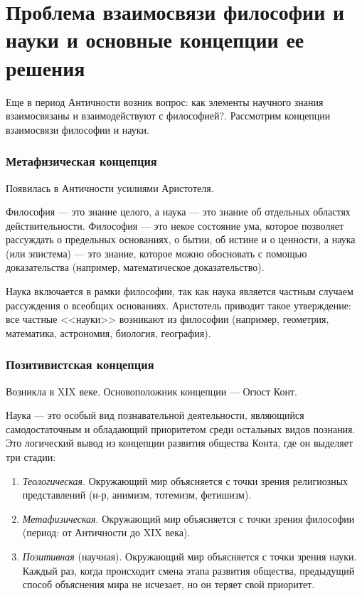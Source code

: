 	\section {Проблема взаимосвязи философии и науки и основные концепции ее решения}

Еще в период Античности возник вопрос: как элементы научного знания взаимосвязаны и взаимодействуют с философией?. Рассмотрим концепции взаимосвязи философии и науки.

\subsubsection{Метафизическая концепция}

Появилась в Античности усилиями Аристотеля.

Философия --- это знание целого, а наука --- это знание об отдельных областях действительности.
Философия --- это некое состояние ума, которое позволяет рассуждать о предельных основаниях, о бытии, об истине и о ценности, а наука (или эпистема) --- это знание, которое можно обосновать с помощью доказательства (например, математическое доказательство). 


Наука включается в рамки философии, так как наука является частным случаем рассуждения о всеобщих основаниях.
Аристотель приводит такое утверждение: все частные <<науки>> возникают из философии (например, геометрия, математика, астрономия, биология, география).

\subsubsection{Позитивистская концепция}

Возникла в XIX веке. Основоположник концепции --- Огюст Конт. 

Наука --- это особый вид познавательной деятельности, являющийся самодостаточным и обладающий приоритетом среди остальных видов познания. 
Это логический вывод из концепции развития общества Конта, где он выделяет три стадии: 
\begin{enumerate}
    \item \textit{Теологическая}. Окружающий мир объясняется с точки зрения религиозных представлений (н-р, анимизм, тотемизм, фетишизм).
    \item \textit{Метафизическая}. Окружающий мир объясняется с точки зрения философии (период: от Античности до XIX века).
    \item \textit{Позитивная} (научная). Окружающий мир объясняется с точки зрения науки.
Каждый раз, когда происходит смена этапа развития общества, предыдущий способ объяснения мира не исчезает, но он теряет свой приоритет.
\end{enumerate}

